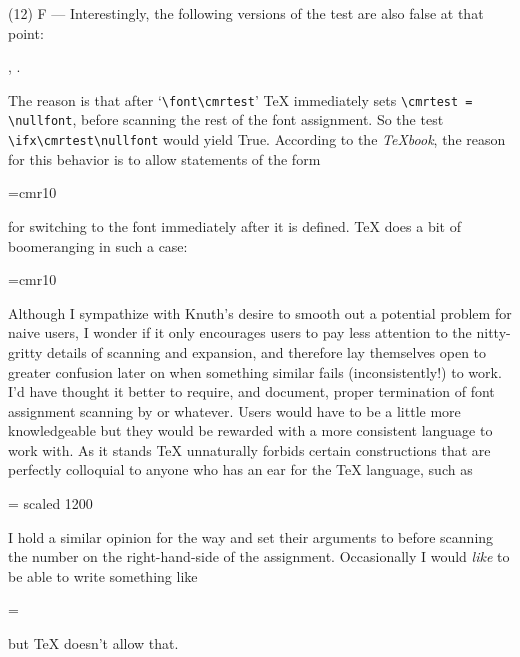 \begin{lcode}
\end{lcode}
(12) F --- Interestingly, the following versions of the  test are
also false at that point:
\begin{lcode}
 \ifx\cmrtest\undefined, \ifx\cmrtest\relax.
\end{lcode}
The reason is that after `\verb?\font\cmrtest?' TeX immediately sets 
\verb?\cmrtest = \nullfont?, before scanning the rest of the font assignment. So the test
\verb?\ifx\cmrtest\nullfont? would yield True. According to the \emph{TeXbook},
the reason for this behavior is to allow statements of the form
\begin{lcode}
  \font\cmrtest=cmr10 \cmrtest
\end{lcode}
for switching to the font \cmd{\cmrtest} immediately after it is defined. TeX
does a bit of boomeranging in such a case:
\begin{lcode}
  \font\cmrtest          %
  =cmr10                 %
  \cmrtest               %
  \cmrtest               %
\end{lcode}
Although I sympathize with Knuth's desire to smooth out a potential
problem for naive users, I wonder if it only encourages users to pay
less attention to the nitty-gritty details of scanning and expansion,
and therefore lay themselves open to greater confusion later on when
something similar fails (inconsistently!) to work. I'd have thought it
better to require, and document, proper termination of font assignment
scanning by \cmd{\relax} or whatever. Users would have to be a little more
knowledgeable but they would be rewarded with a more consistent language
to work with.  As it stands TeX unnaturally forbids certain
constructions that are perfectly colloquial to anyone who has an ear for
the TeX language, such as
\begin{lcode}
  \font\tenrm = \fontname\tenrm\space scaled 1200
\end{lcode}
I hold a similar opinion for the way \cmd{\chardef} and \cmd{\mathchardef} set their
arguments to \cmd{\relax} before scanning the number on the right-hand-side of
the assignment. Occasionally I would \emph{like} to be able to write
something like
\begin{lcode}
 \chardef\foo=\ifcase{}\fi
\end{lcode}
 but TeX doesn't allow that.

